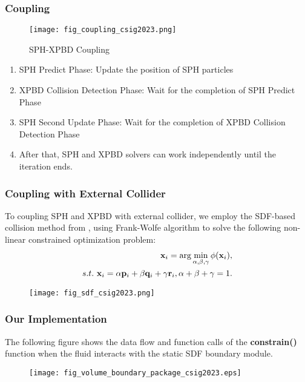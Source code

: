 \begin{frame}
    \frametitle{Coupling}
    \begin{figure}
        \centering
        \texttt{[image: fig\_coupling\_csig2023.png]}
        \caption{SPH-XPBD Coupling}
    \end{figure}
\end{frame}

\begin{frame}
    \begin{enumerate}
        \item SPH Predict Phase: Update the position of SPH particles
        \item XPBD Collision Detection Phase: Wait for the completion of SPH Predict Phase
        \item SPH Second Update Phase: Wait for the completion of XPBD Collision Detection Phase
        \item After that, SPH and XPBD solvers can work independently until the iteration ends.
    \end{enumerate}
\end{frame}

\begin{frame}
    \frametitle{Coupling with External Collider}
    To coupling SPH and XPBD with external collider, we employ the SDF-based collision method from \cite{macklin_local_2020}, using Frank-Wolfe algorithm to solve the following non-linear constrained optimization problem:
    \begin{align}
        \mathbf {x}_i =	\arg\min_{\alpha,\beta,\gamma}\phi(\mathbf{x}_i), \notag \\
        s.t.\ \mathbf{x}_i =\alpha \mathbf{p}_i + \beta\mathbf{q}_i + \gamma\mathbf{r}_i, \alpha +\beta  + \gamma = 1. \notag
    \end{align}
    \begin{figure}[H]
        \centering
        \texttt{[image: fig\_sdf\_csig2023.png]}
    \end{figure}
\end{frame}

\begin{frame}
    \frametitle{Our Implementation}
    The following figure shows the data flow and function calls of the \textbf{constrain()} function when the fluid interacts with the static SDF boundary module.
    \begin{figure}[H]
        \centering
        \texttt{[image: fig\_volume\_boundary\_package\_csig2023.eps]}
    \end{figure}
\end{frame}

